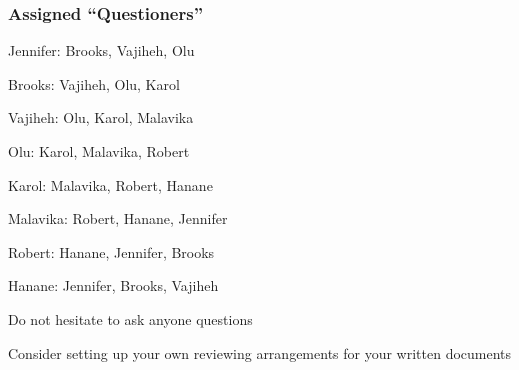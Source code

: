 \documentclass[t,12pt,numbers,fleqn]{beamer}
\begin{document}

\begin{frame}
\frametitle{Assigned ``Questioners''}

\be
\item Jennifer: Brooks, Vajiheh, Olu
\item Brooks: Vajiheh, Olu, Karol
\item Vajiheh: Olu, Karol, Malavika
\item Olu: Karol, Malavika, Robert
\item Karol: Malavika, Robert, Hanane
\item Malavika: Robert, Hanane, Jennifer
\item Robert: Hanane, Jennifer, Brooks
\item Hanane: Jennifer, Brooks, Vajiheh
\ee
\bi
\item Do not hesitate to ask anyone questions
\item Consider setting up your own reviewing arrangements for your written
  documents
\ei
\end{frame}

\end{document}
